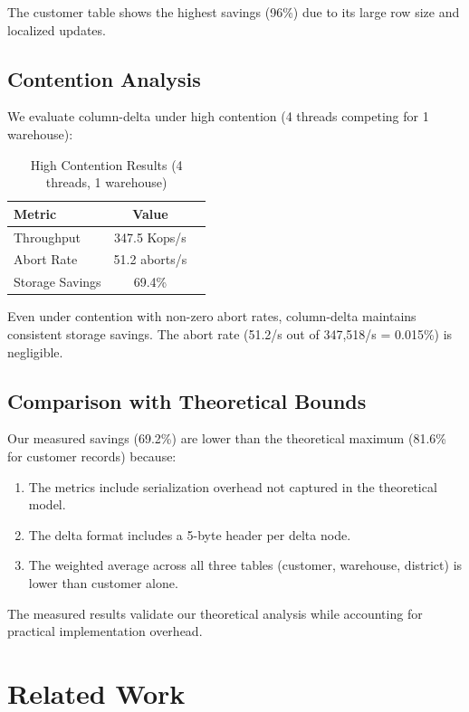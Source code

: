 \documentclass[letterpaper,twocolumn,10pt]{article}
\begin{document}
The customer table shows the highest savings (96\%) due to its large row size and localized updates.

\subsection{Contention Analysis}

We evaluate column-delta under high contention (4 threads competing for 1 warehouse):

\begin{table}[t]
\centering
\caption{High Contention Results (4 threads, 1 warehouse)}
\label{tab:contention}
\begin{tabular}{lcc}
\toprule
Metric & Value \\
\midrule
Throughput & 347.5 Kops/s \\
Abort Rate & 51.2 aborts/s \\
Storage Savings & 69.4\% \\
\bottomrule
\end{tabular}
\end{table}

Even under contention with non-zero abort rates, column-delta maintains consistent storage savings. The abort rate (51.2/s out of 347,518/s = 0.015\%) is negligible.

\subsection{Comparison with Theoretical Bounds}

Our measured savings (69.2\%) are lower than the theoretical maximum (81.6\% for customer records) because:

\begin{enumerate}
\item The metrics include serialization overhead not captured in the theoretical model.
\item The delta format includes a 5-byte header per delta node.
\item The weighted average across all three tables (customer, warehouse, district) is lower than customer alone.
\end{enumerate}

The measured results validate our theoretical analysis while accounting for practical implementation overhead.

\section{Related Work}
\label{sec:related}
\end{document}
